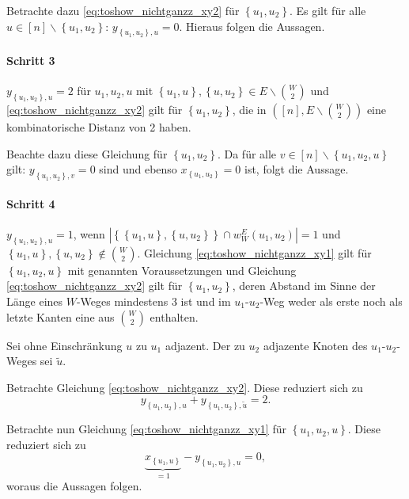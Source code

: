 \documentclass[10p,a4paper,BCOR = 12mm, DIV=15]{scrbook}
\begin{document}
{\begin{bew}
Betrachte dazu \eqref{eq:toshow_nichtganzz_xy2} für $\left\{u_1, u_2\right\}$. Es gilt für alle $u \in \left[n\right] \backslash \left\{u_1, u_2\right\}$: $y_{\left\{u_1, u_2\right\}, u} = 0$. Hieraus folgen die Aussagen.

\paragraph{Schritt 3}
$y_{\left\{u_1, u_2\right\}, u} = 2$ für $u_1, u_2, u$ mit $\left\{u_1, u\right\}, \left\{u, u_2\right\} \in E \backslash {W \choose 2}$ und \eqref{eq:toshow_nichtganzz_xy2} gilt für $\left\{u_1, u_2\right\}$, die in $\left(\left[n\right], E \backslash  {W \choose 2}\right)$ eine kombinatorische Distanz von 2 haben.

Beachte dazu diese Gleichung für $\left\{u_1, u_2\right\}$. Da für alle $v \in \left[n\right] \backslash \left\{u_1, u_2, u\right\}$ gilt: $y_{\left\{u_1, u_2\right\}, v}  = 0$ sind und ebenso $x_{\left\{u_1, u_2\right\}} = 0$ ist, folgt die Aussage.

\paragraph{Schritt 4}
$y_{\left\{u_1, u_2\right\}, u} = 1$, wenn $\left|\left\{\left\{u_1, u\right\}, \left\{u, u_2\right\}\right\} \cap w_W^E\left(u_1, u_2\right)\right| = 1$ und $\left\{u_1, u\right\}, \left\{u, u_2\right\} \notin {W \choose 2}$. Gleichung \eqref{eq:toshow_nichtganzz_xy1} gilt für $\left\{u_1, u_2, u\right\}$ mit genannten Voraussetzungen und
Gleichung \eqref{eq:toshow_nichtganzz_xy2} gilt für $\left\{u_1, u_2\right\}$, deren Abstand im Sinne der Länge eines $W$-Weges mindestens 3 ist und im $u_1$-$u_2$-Weg weder als erste noch als letzte Kanten eine aus ${W \choose 2}$ enthalten.

Sei ohne Einschränkung $u$ zu $u_1$ adjazent. Der zu $u_2$ adjazente Knoten des $u_1$-$u_2$-Weges sei $\widetilde{u}$.

Betrachte Gleichung \eqref{eq:toshow_nichtganzz_xy2}. Diese reduziert sich zu
\begin{displaymath}
y_{\left\{u_1, u_2\right\}, u} + y_{\left\{u_1, u_2\right\}, \widetilde{u}} = 2.
\end{displaymath}

Betrachte nun Gleichung \eqref{eq:toshow_nichtganzz_xy1} für $\left\{u_1, u_2, u\right\}$. Diese reduziert sich zu
\begin{displaymath}
\underbrace{x_{\left\{u_1, u\right\}}}_{=1} - y_{\left\{u_1, u_2\right\}, u} = 0,
\end{displaymath}
woraus die Aussagen folgen.


\end{bew}}
\end{document}
